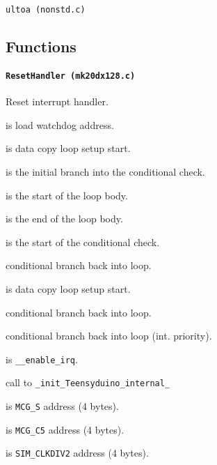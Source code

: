 \hspace{8mm} \texttt{ultoa (nonstd.c)}

\subsection{Functions}

\paragraph{\texttt{ResetHandler (mk20dx128.c)}} Reset interrupt handler.

 is load watchdog address.

\vspace{1em}

 is data copy loop setup start.

 is the initial branch into the conditional check.

 is the start of the loop body.

 is the end of the loop body.

 is the start of the conditional check.

 conditional branch back into loop.

\vspace{1em}

 is data copy loop setup start.

 conditional branch back into loop.

\vspace{1em}

 conditional branch back into loop (int. priority).

\vspace{1em}

 is \texttt{\_\_enable\_irq}.

 call to \texttt{\_init\_Teensyduino\_internal\_}

\vspace{1em}

 is \texttt{MCG\_S} address (4 bytes).

 is \texttt{MCG\_C5} address (4 bytes).

 is \texttt{SIM\_CLKDIV2} address (4 bytes).


